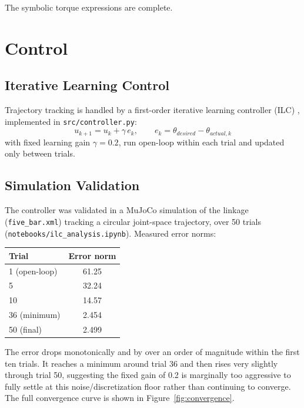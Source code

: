 \documentclass[11pt]{article}
\begin{document}
The symbolic torque expressions are complete.


\section{Control}

\subsection{Iterative Learning Control}

Trajectory tracking is handled by a first-order iterative learning controller (ILC) \cite{arimoto1984bettering}, implemented in \texttt{src/controller.py}:
\[
u_{k+1} = u_k + \gamma\, e_k, \qquad e_k = \theta_{desired} - \theta_{actual,k}
\]
with fixed learning gain $\gamma = 0.2$, run open-loop within each trial and updated only between trials.

\subsection{Simulation Validation}

The controller was validated in a MuJoCo simulation of the linkage (\texttt{five\_bar.xml}) tracking a circular joint-space trajectory, over 50 trials (\texttt{notebooks/ilc\_analysis.ipynb}). Measured error norms:

\begin{center}
\begin{tabular}{lc}
\hline
Trial & Error norm \\
\hline
1 (open-loop)  & 61.25 \\
5              & 32.24 \\
10             & 14.57 \\
36 (minimum)   & 2.454 \\
50 (final)     & 2.499 \\
\hline
\end{tabular}
\end{center}

The error drops monotonically and by over an order of magnitude within the first ten trials. It reaches a minimum around trial 36 and then rises very slightly through trial 50, suggesting the fixed gain of 0.2 is marginally too aggressive to fully settle at this noise/discretization floor rather than continuing to converge. The full convergence curve is shown in Figure~\ref{fig:convergence}.
\end{document}
